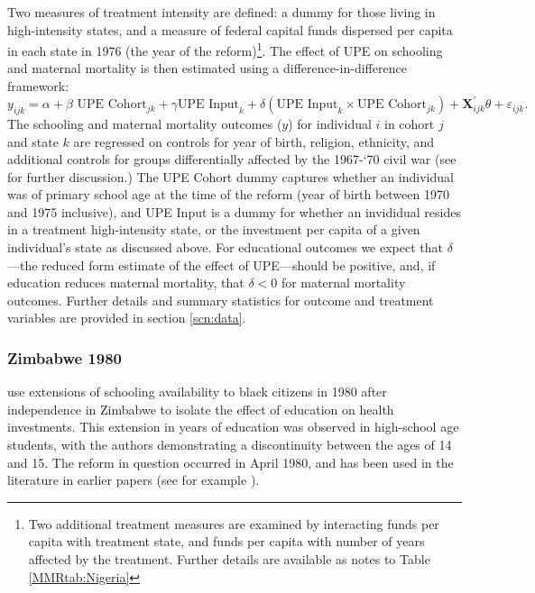 \documentclass{article}[12pt,subeqn]
\begin{document}
\begin{spacing}{1.4}
Two measures of treatment intensity are defined: a dummy for those living in 
high-intensity states, and a measure of federal capital funds dispersed per capita 
in each state in 1976 (the year of the reform)\footnote{Two additional treatment 
measures are examined by interacting funds per capita with treatment state, and 
funds per capita with number of years affected by the treatment. Further details 
are available as notes to Table \ref{MMRtab:Nigeria}}.  The effect of UPE on 
schooling and maternal mortality is then estimated using a difference-in-difference 
framework:
\begin{equation}
 \label{eqn:Nigeria}
  y_{ijk}=\alpha + \beta \text{ UPE Cohort}_{jk}+\gamma \text{UPE Input}_k+
   \delta(\text{UPE Input}_k\times\text{UPE Cohort}_{jk})+
   \textbf{X}^\prime_{ijk}\theta+\varepsilon_{ijk}.
\end{equation}
The schooling and maternal mortality outcomes ($y$) for individual $i$ in cohort 
$j$ and state $k$ are regressed on controls for year of birth, religion, 
ethnicity, and additional controls for groups differentially affected by the 
1967-`70 civil war (see \citet{Akreshetal2012} for further discussion.)  The UPE 
Cohort dummy captures whether an individual was of primary school age at the time 
of the reform (year of birth between 1970 and 1975 inclusive), and UPE Input is a 
dummy for whether an invididual resides in a treatment high-intensity state, or 
the investment per capita of a given individual's state as discussed above.  For 
educational outcomes we expect that $\delta$---the reduced form estimate of the 
effect of UPE---should be positive, and, if education reduces maternal mortality, 
that $\delta<0$ for maternal mortality outcomes.  Further details and summary 
statistics for outcome and treatment variables are provided in section 
\ref{scn:data}.

\subsubsection{Zimbabwe 1980}
\label{ssscn:empiricsZimbabwe}
\citet{AgueroBharawadj2011} use extensions of schooling availability to black 
citizens in 1980 after independence in Zimbabwe to isolate the effect of 
education on health investments. This extension in years of education was 
observed in high-school age students, with the authors demonstrating a 
discontinuity between the ages of 14 and 15.  The reform in question occurred in 
April 1980, and has been used in the literature in earlier papers (see for 
example \citet{Edwards1995}).


\end{spacing}
\end{document}
